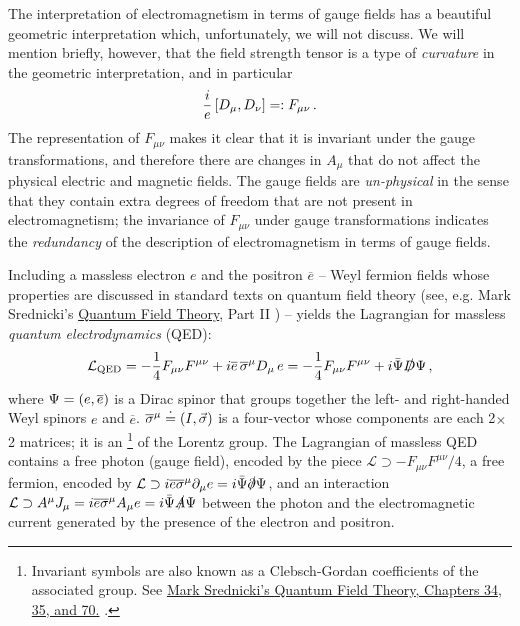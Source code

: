 The interpretation of electromagnetism in terms of gauge fields has a beautiful geometric interpretation which, unfortunately, we will not discuss.
%
We will mention briefly, however, that the field strength tensor is a type of \textit{curvature} in the geometric interpretation, and in particular
\begin{align}
    \frac{i}{e} \, \comm{D_\mu}{D_\nu} =: F_{\mu\nu}
    \,.
\end{align}
%
The representation of \(F_{\mu\nu}\) makes it clear that it is invariant under the gauge transformations, and therefore there are changes in \(A_\mu\) that do not affect the physical electric and magnetic fields.
%
The gauge fields are \textit{un-physical} in the sense that they contain extra degrees of freedom that are not present in electromagnetism;
%
the invariance of \(F_{\mu\nu}\) under gauge transformations indicates the \textit{redundancy} of the description of electromagnetism in terms of gauge fields.

Including a massless electron \(e\) and the positron \(\overline{e}\) -- Weyl fermion fields whose properties are discussed in standard texts on quantum field theory (see, e.g. Mark Srednicki's \underline{Quantum Field Theory}, Part II \cite{Srednicki:2007qs}) -- yields the Lagrangian for massless \textit{quantum electrodynamics} (QED):
\begin{align}
    \mathcal{L}_\text{QED}
    =
    -\frac{1}{4}F_{\mu\nu} F^{\mu\nu}
    +
    i \overline{e} \, \overline{\sigma}^\mu D_\mu \, e
    =
    -\frac{1}{4}F_{\mu\nu} F^{\mu\nu}
    +
    i \bar{\Psi} \slashed{D} \Psi
    \,,
\end{align}
where \(\Psi = \left(e, \overline{e}\right)\) is a Dirac spinor that groups together the left- and right-handed Weyl spinors \(e\) and \(\overline{e}\).
%
\(\overline{\sigma}^\mu \overset{\boldsymbol{\cdot}}{=} \left(I, \vec{\sigma}\right)\) is a four-vector whose components are each 2\(\times\)2 matrices;
%
it is an %
\footnote{
    Invariant symbols are also known as a Clebsch-Gordan coefficients of the associated group.
    See \href{https://web.physics.ucsb.edu/~mark/ms-qft-DRAFT.pdf\#page=415}{Mark Srednicki's \underline{Quantum Field Theory}, Chapters 34, 35, and 70.} \cite{Srednicki:2007qs}.
}
%
of the Lorentz group.
%
The Lagrangian of massless QED contains a free photon (gauge field), encoded by the piece \(\mathcal{L} \supset -F_{\mu\nu}F^{\mu\nu}/4\), a free fermion, encoded by \(\mathcal{L} \supset i\overline{e} \overline{\sigma}^\mu \partial_\mu e = i \bar{\Psi} \slashed{\partial} \Psi\), and an interaction \(\mathcal{L} \supset A^\mu J_\mu = i\overline{e} \overline{\sigma}^\mu A_\mu e = i \bar{\Psi} \slashed{A} \Psi\) between the photon and the electromagnetic current generated by the presence of the electron and positron.


